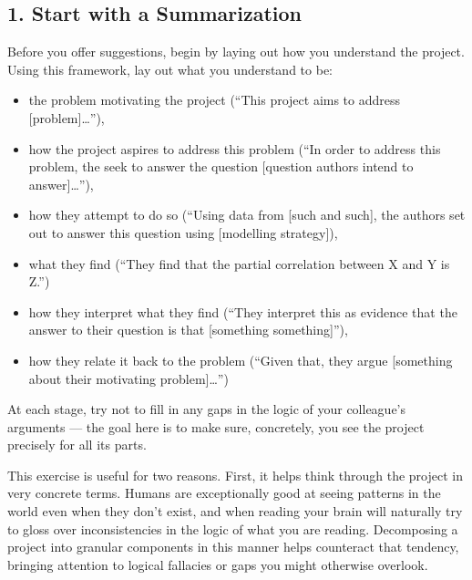 \documentclass[letterpaper,10pt,english]{jupyterBook}
\begin{document}
\subsection{1. Start with a Summarization}
\label{\detokenize{40_in_practice/30_giving_feedback:start-with-a-summarization}}
\sphinxAtStartPar
Before you offer suggestions, begin by laying out how you understand the project. Using this framework, lay out what you understand to be:
\begin{itemize}
\item {} 
\sphinxAtStartPar
the problem motivating the project (“This project aims to address {[}problem{]}…”),

\item {} 
\sphinxAtStartPar
how the project aspires to address this problem (“In order to address this problem, the seek to answer the question {[}question authors intend to answer{]}…”),

\item {} 
\sphinxAtStartPar
how they attempt to do so (“Using data from {[}such and such{]}, the authors set out to answer this question using {[}modelling strategy{]}),

\item {} 
\sphinxAtStartPar
what they find  (“They find that the partial correlation between X and Y is Z.”)

\item {} 
\sphinxAtStartPar
how they interpret what they find (“They interpret this as evidence that the answer to their question is that {[}something something{]}”),

\item {} 
\sphinxAtStartPar
how they relate it back to the problem (“Given that, they argue {[}something about their motivating problem{]}…”)

\end{itemize}

\sphinxAtStartPar
At each stage, try not to fill in any gaps in the logic of your colleague’s arguments — the goal here is to make sure, concretely, you see the project precisely for all its parts.

\sphinxAtStartPar
This exercise is useful for two reasons. First, it helps  think through the project in very concrete terms. Humans are exceptionally good at seeing patterns in the world even when they don’t exist, and when reading your brain will naturally try to gloss over inconsistencies in the logic of what you are reading. Decomposing a project into granular components in this manner helps counteract that tendency, bringing attention to logical fallacies or gaps you might otherwise overlook.
\end{document}
